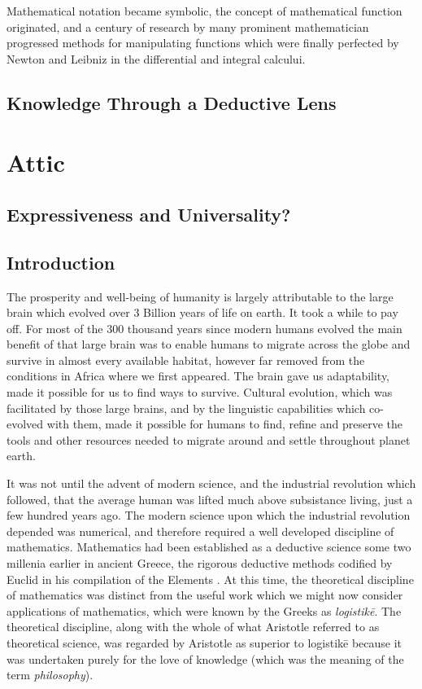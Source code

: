 \documentclass[10pt,titlepage]{book}
\begin{document}
Mathematical notation became symbolic, the concept of mathematical function originated, and a century of research by many prominent mathematician progressed methods for manipulating functions which were finally perfected by Newton and Leibniz in the differential and integral calcului.




\chapter{Knowledge Through a Deductive Lens}\label{ChapKTDL}

\part{Attic}

\chapter{Expressiveness and Universality?}

\chapter{Introduction}

The prosperity and well-being of humanity is largely attributable to the large brain which evolved over 3 Billion years of life on earth.
It took a while to pay off.
For most of the 300 thousand years since modern humans evolved the main benefit of that large brain was to enable humans to migrate across the globe and survive in almost every available habitat, however far removed from the conditions in Africa where we first appeared.
The brain gave us adaptability, made it possible for us to find ways to survive.
Cultural evolution, which was facilitated by those large brains, and by the linguistic capabilities which co-evolved with them, made it possible for humans to find, refine and preserve the tools and other resources needed to migrate around and settle throughout planet earth.

It was not until the advent of modern science, and the industrial revolution which followed, that the average human was lifted much above subsistance living, just a few hundred years ago.
The modern science upon which the industrial revolution depended was numerical, and therefore required a well developed discipline of mathematics.
Mathematics had been established as a deductive science some two millenia earlier in ancient Greece, the rigorous deductive methods codified by Euclid in his compilation of the Elements \cite{euclidEL1}.
At this time, the theoretical discipline of mathematics was distinct from the useful work which we might now consider applications of mathematics, which were known by the Greeks as \emph{logistikē}.
The theoretical discipline, along with the whole of what Aristotle referred to as theoretical science, was regarded by Aristotle as superior to logistikē because it was undertaken purely for the love of knowledge (which was the meaning of the term \emph{philosophy}).
\end{document}
